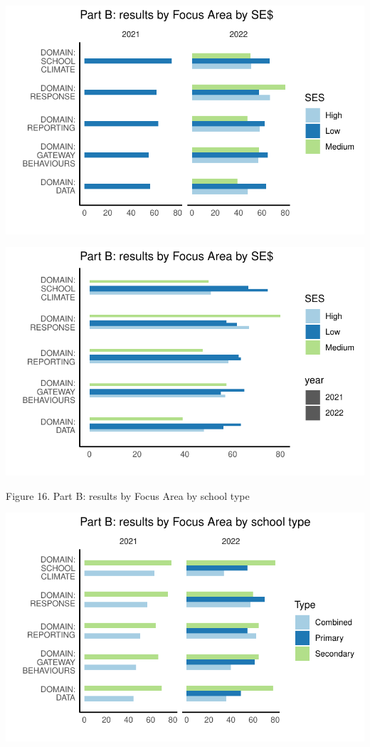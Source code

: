 \documentclass[
  letterpaper,
  DIV=11,
  numbers=noendperiod]{scrartcl}
\begin{document}
\includegraphics{report_files/figure-pdf/unnamed-chunk-17-1.pdf}

\includegraphics{report_files/figure-pdf/unnamed-chunk-17-2.pdf}

Figure 16. Part B: results by Focus Area by school type

\includegraphics{report_files/figure-pdf/unnamed-chunk-18-1.pdf}
\end{document}
